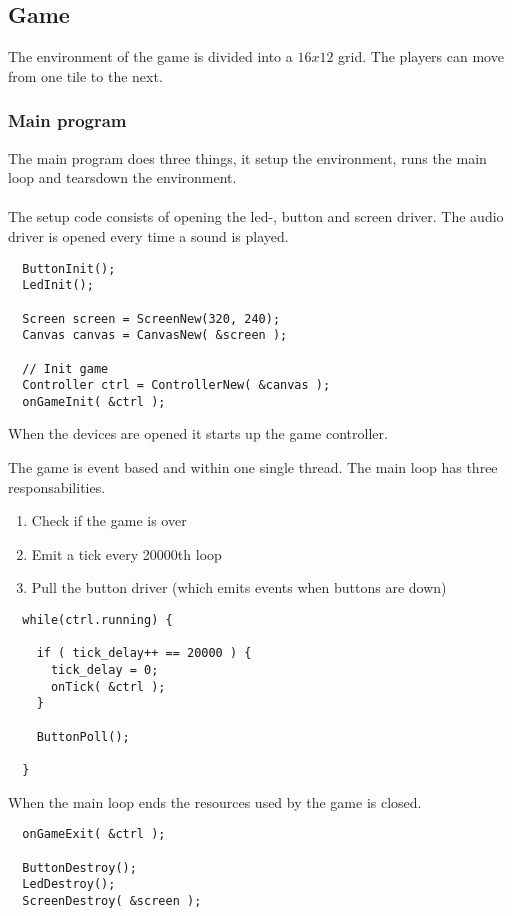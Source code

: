 \subsection{Game}

The environment of the game is divided into a $16x12$ grid. The players can move from one tile
to the next.

\subsubsection{Main program}

The main program does three things, it setup the environment, runs the main loop and tearsdown the environment.\\
\\
The setup code consists of opening the led-, button and screen driver. The audio driver is opened every
time a sound is played.
\begin{lstlisting}
  ButtonInit();
  LedInit();

  Screen screen = ScreenNew(320, 240);
  Canvas canvas = CanvasNew( &screen );

  // Init game
  Controller ctrl = ControllerNew( &canvas );
  onGameInit( &ctrl );
\end{lstlisting}
When the devices are opened it starts up the game controller.

The game is event based and within one single thread. The main loop has three responsabilities.
\begin{enumerate}
\item Check if the game is over
\item Emit a tick every 20000th loop
\item Pull the button driver (which emits events when buttons are down)
\end{enumerate}
\begin{lstlisting}
  while(ctrl.running) {

    if ( tick_delay++ == 20000 ) {
      tick_delay = 0;
      onTick( &ctrl );
    }

    ButtonPoll();

  }
\end{lstlisting}

When the main loop ends the resources used by the game is closed.
\begin{lstlisting}
  onGameExit( &ctrl );

  ButtonDestroy();
  LedDestroy();
  ScreenDestroy( &screen );
\end{lstlisting}

